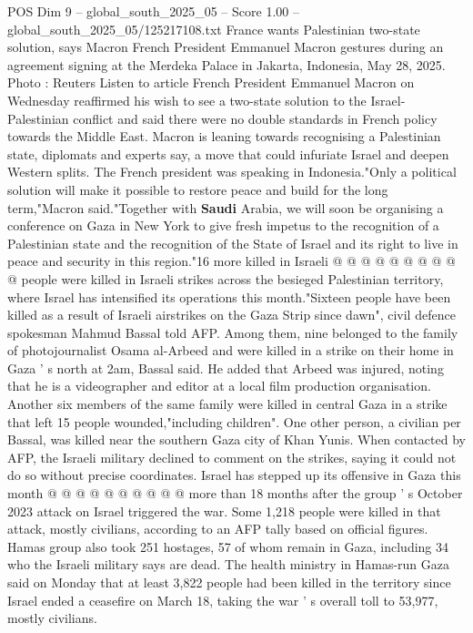 \begin{textsample}{POS Dim 9 – global\_south\_2025\_05 – Score 1.00 – global\_south\_2025\_05/125217108.txt}  \label{ex:f9_pos_219}
France wants Palestinian two-state solution, says Macron French President Emmanuel Macron gestures during an agreement signing at the Merdeka Palace in Jakarta, Indonesia, May 28, 2025.
Photo : Reuters Listen to article French President Emmanuel Macron on Wednesday reaffirmed his wish to see a two-state solution to the Israel-Palestinian conflict and said there were no double standards in French policy towards the Middle East.
Macron is leaning towards recognising a Palestinian state, diplomats and experts say, a move that could infuriate Israel and deepen Western splits.
The French president was speaking in Indonesia."Only a political solution will make it possible to restore peace and build for the long term,"Macron said."Together with \textbf{Saudi} Arabia, we will soon be organising a conference on Gaza in New York to give fresh impetus to the recognition of a Palestinian state and the recognition of the State of Israel and its right to live in peace and security in this region."16 more killed in Israeli @ @ @ @ @ @ @ @ @ @ people were killed in Israeli strikes across the besieged Palestinian territory, where Israel has intensified its operations this month."Sixteen people have been killed as a result of Israeli airstrikes on the Gaza Strip since dawn", civil defence spokesman Mahmud Bassal told AFP.
Among them, nine belonged to the family of photojournalist Osama al-Arbeed and were killed in a strike on their home in Gaza ' s north at 2am, Bassal said.
He added that Arbeed was injured, noting that he is a videographer and editor at a local film production organisation.
Another six members of the same family were killed in central Gaza in a strike that left 15 people wounded,"including children".
One other person, a civilian per Bassal, was killed near the southern Gaza city of Khan Yunis.
When contacted by AFP, the Israeli military declined to comment on the strikes, saying it could not do so without precise coordinates.
Israel has stepped up its offensive in Gaza this month @ @ @ @ @ @ @ @ @ @ more than 18 months after the group ' s October 2023 attack on Israel triggered the war.
Some 1,218 people were killed in that attack, mostly civilians, according to an AFP tally based on official figures.
Hamas group also took 251 hostages, 57 of whom remain in Gaza, including 34 who the Israeli military says are dead.
The health ministry in Hamas-run Gaza said on Monday that at least 3,822 people had been killed in the territory since Israel ended a ceasefire on March 18, taking the war ' s overall toll to 53,977, mostly civilians.

\end{textsample}
